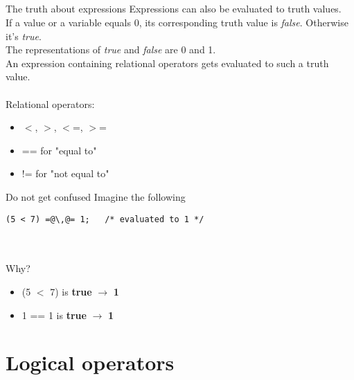 \subsection{}
\begin{frame}{The truth about expressions}
	Expressions can also be evaluated to truth values.\\
	If a value or a variable equals 0, its corresponding truth value is \textit{false}. Otherwise it's \textit{true}.\\
	The representations of \textit{true} and \textit{false} are 0 and 1.\\
	An expression containing relational operators gets evaluated to such a truth value.\\
	\ \\Relational operators:
	\begin{itemize}
		\item $<$, $>$, $<$=, $>$=
		\item == for "equal to"
		\item != for "not equal to"
	\end{itemize}
\end{frame}
\begin{frame}[fragile]{Do not get confused}
	Imagine the following
	\begin{lstlisting}[numbers=none]
(5 < 7) =@\,@= 1;	/* evaluated to 1 */
\end{lstlisting}
\ \\\ \\Why?
\begin{itemize}
	\item<2-> (5 $<$ 7) is \textbf{true} $\rightarrow$ \textbf{1}
	\item<3-> 1 == 1 is \textbf{true} $\rightarrow$ \textbf{1}
\end{itemize}
\end{frame}
\section{Logical operators}
